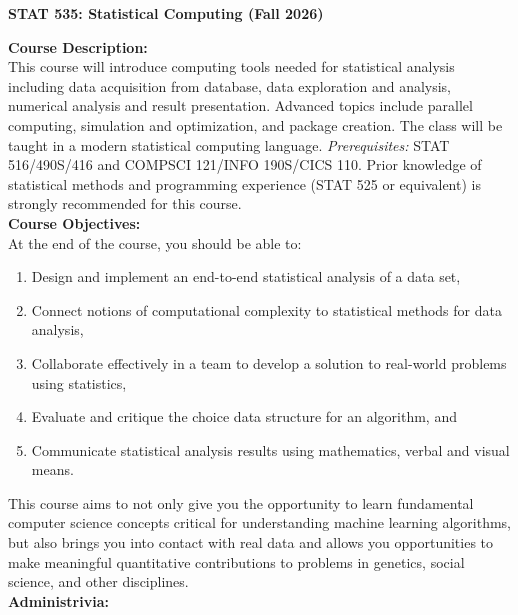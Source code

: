 \documentclass{article}
\begin{document}
\begin{center}
\textbf{STAT 535: Statistical Computing (Fall 2026)}
\end{center}


\noindent \textbf{Course Description:} \\ 

This course will introduce computing tools needed for statistical analysis including data acquisition from database, data exploration and analysis, numerical analysis and result presentation.  Advanced topics include parallel computing, simulation and optimization, and package creation.  The class will be taught in a modern statistical computing language. \emph{Prerequisites:} STAT 516/490S/416 and COMPSCI 121/INFO 190S/CICS 110.
	Prior knowledge of statistical methods and programming experience (STAT 525 or 	equivalent) is strongly recommended for this course. \\

\noindent \textbf{Course Objectives:} \\

At the end of the course, you should be able to:
\begin{enumerate}
  \item Design and implement an end-to-end statistical analysis of a data set,\vspace{-2mm}
  \item Connect notions of computational complexity to statistical methods for data analysis,\vspace{-2mm}
  \item Collaborate effectively in a team to develop a solution to real-world problems using statistics,\vspace{-2mm}
  \item Evaluate and critique the choice data structure for an algorithm, and\vspace{-2mm}
  \item Communicate statistical analysis results using mathematics, verbal and visual means.
\end{enumerate}

This course aims to not only give you the opportunity to learn fundamental computer science concepts critical for understanding machine learning algorithms, but also brings you into contact with real data and allows you opportunities to make meaningful quantitative contributions to problems in genetics, social science, and other disciplines. \\

 
\noindent \textbf{Administrivia:} 
\end{document}
